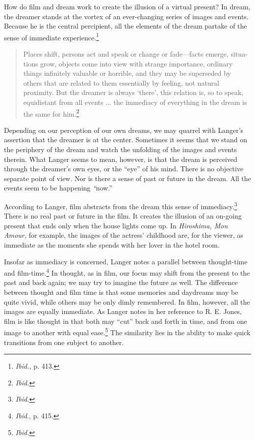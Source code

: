 \documentclass{tufte-handout}
\begin{document}
How do film and dream work to create the illusion of a virtual present?
In dream, the dreamer stands at the vortex of an ever-changing series of
images and events. Because he is the central percipient, all the
elements of the dream partake of the sense of immediate
experience.\footnote{\emph{Ibid.,} p. 413.}

\begin{quote}
Places shift, persons act and speak or change or fade---facts emerge,
situa­tions grow, objects come into view with strange importance,
ordinary things infinitely valuable or horrible, and they may be
superseded by others that are related to them essentially by feeling,
not natural proximity. But the dreamer is always `there', this relation
is, so to speak, equidistant from all events ... the immediacy of
everything in the dream is the same for him.\footnote{\emph{Ibid.}}
\end{quote}

\noindent Depending on our perception of our own dreams, we may quarrel with
Langer's assertion that the dreamer is at the center. Sometimes it seems
that we stand on the periphery of the dream and watch the unfolding of
the images and events therein. What Langer seems to mean, however, is
that the dream is perceived through the dreamer's own eyes, or the
``eye'' of his mind. There is no objective separate point of view. Nor
is there a sense of past or future in the dream. All the events seem to
be happening\emph{ ``}now.''

According to Langer, film abstracts from the dream this sense of
im­mediacy.\footnote{\emph{Ibid.}} There is no real past or future in the
film. It creates the illusion of an on-going present that ends only when
the house lights come up. In \emph{Hiroshima, Mon Amour,} for example,
the images of the actress' childhood are, for the viewer, as immediate
as the moments she spends with her lover in the hotel room.

Insofar as immediacy is concerned, Langer notes a parallel between
thought-time and film-time.\footnote{\emph{Ibid}., p. 415.} In thought,
as in film, our focus may shift from the present to the past and back
again; we may try to imagine the future as well. The difference between
thought and film time is that some memories and daydreams may be quite
vivid, while others may be only dimly remembered. In film, however, all
the images are equally immediate. As Langer notes in her reference to R.
E. Jones, film is like thought in that both may ``cut'' back and forth
in time, and from one image to another with equal ease.\footnote{\emph{Ibid.}}
The similarity lies in the ability to make quick transitions from one
subject to another.
\end{document}
